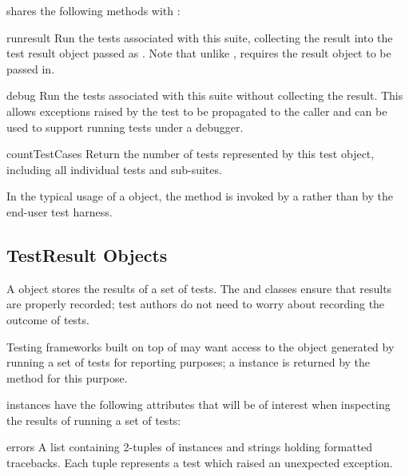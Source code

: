  shares the following methods with :

\begin{methoddesc}[TestSuite]{run}{result}
  Run the tests associated with this suite, collecting the result into
  the test result object passed as .  Note that unlike
  ,  requires the
  result object to be passed in.
\end{methoddesc}

\begin{methoddesc}[TestSuite]{debug}{}
  Run the tests associated with this suite without collecting the result.
  This allows exceptions raised by the test to be propagated to the caller
  and can be used to support running tests under a debugger.
\end{methoddesc}

\begin{methoddesc}[TestSuite]{countTestCases}{}
  Return the number of tests represented by this test object, including
  all individual tests and sub-suites.
\end{methoddesc}

In the typical usage of a  object, the 
method is invoked by a  rather than by the end-user
test harness.


\subsection{TestResult Objects
            \label{testresult-objects}}

A  object stores the results of a set of tests.  The
 and  classes ensure that results are
properly recorded; test authors do not need to worry about recording the
outcome of tests.

Testing frameworks built on top of  may want
access to the  object generated by running a set of
tests for reporting purposes; a  instance is
returned by the  method for this purpose.

 instances have the following attributes that will
be of interest when inspecting the results of running a set of tests:

\begin{memberdesc}[TestResult]{errors}
  A list containing 2-tuples of  instances and
  strings holding formatted tracebacks. Each tuple represents a test which
  raised an unexpected exception.
\end{memberdesc}

